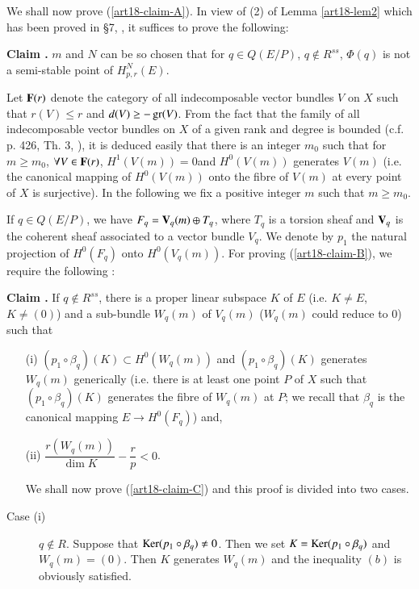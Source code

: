 We shall now prove (\ref{art18-claim-A}). In view of (2) of Lemma \ref{art18-lem2} which has been proved in \S7, \cite{art18-key12}, it suffices to prove the following:

\medskip
\noindent
{\bf Claim .\label{art18-claim-B}}
$m$ and $N$ can be so chosen that for $q\in Q(E/P)$, $q\not\in R^{ss}$, $\Phi(q)$ is not a semi-stable point of $H^{N}_{p,r}(E)$.
\smallskip

Let $\mathbf{F}(r)$ denote the category of all indecomposable vector bundles $V$ on $X$ such that $r(V)\leq r$ and $d(V)\geq -\operatorname{\mathrm{gr}} (V)$. From the fact that the family of all indecomposable vector bundles on $X$ of a given rank and degree is bounded (c.f. p. 426, Th. 3, \cite{art18-key1}), it is deduced easily that there is an integer $m_{0}$ such that for $m\geq m_{0}$, $\forall V\in \mathbf{F}(r)$, $H^{1}(V(m))=0$\pageoriginale and $H^{0}(V(m))$ generates $V(m)$ (i.e. the canonical mapping of $H^{0}(V(m))$ onto the fibre of $V(m)$ at every point of $X$ is surjective). In the following we fix a positive integer $m$ such that $m\geq m_{0}$.

If $q\in Q(E/P)$, we have $F_{q}=\mathbf{V}_{q}(m)\oplus T_{q}$, where $T_{q}$ is a torsion sheaf and $\mathbf{V}_{q}$ is the coherent sheaf associated to a vector bundle $V_{q}$. We denote by $p_{1}$ the natural projection of $H^{0}(F_{q})$ onto $H^{0}(V_{q}(m))$. For proving (\ref{art18-claim-B}), we require the following :

\medskip
\noindent
{\bf Claim .\label{art18-claim-C}}
If $q\not\in R^{ss}$, there is a proper linear subspace $K$ of $E$ (i.e. $K\neq E$, $K\neq (0)$) and a sub-bundle $W_{q}(m)$ of $V_{q}(m)$ ($W_{q}(m)$ could reduce to $0$) such that
\begin{itemize}
\item[(i)] $(p_{1}\circ \beta_{q})(K)\subset H^{0}(W_{q}(m))$ and $(p_{1}\circ \beta_{q})(K)$ generates $W_{q}(m)$ generically (i.e. there is at least one point $P$ of $X$ such that $(p_{1}\circ \beta_{q})(K)$ generates the fibre of $W_{q}(m)$ at $P$; we recall that $\beta_{q}$ is the canonical mapping $E\to H^{0}(F_{q})$) and,

\item[(ii)]\hfill $\dfrac{r(W_{q}(m))}{\dim K}-\dfrac{r}{p}<0$.\hfill\,

\smallskip
We shall now prove (\ref{art18-claim-C}) and this proof is divided into two cases.
\end{itemize}

\begin{description}
\item[Case (i)] $q\not\in R$. Suppose that $\operatorname{\mathrm{Ker}} (p_{1}\circ \beta_{q})\neq 0$. Then we set $K=\operatorname{\mathrm{Ker}} (p_{1}\circ \beta_{q})$ and $W_{q}(m)=(0)$. Then $K$ generates $W_{q}(m)$ and the inequality $(b)$ is obviously satisfied.
\end{description}

